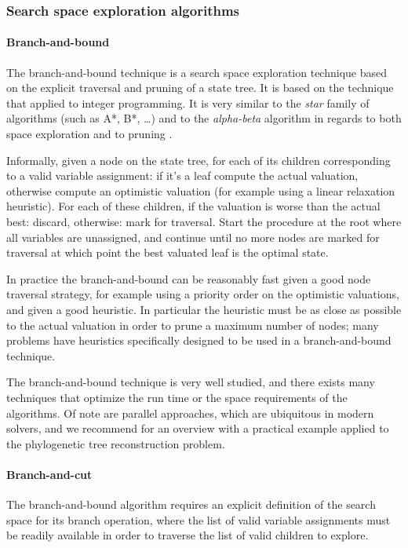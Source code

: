 		\subsubsection{Search space exploration algorithms}
		\label{subsec:bnsalgo}

			\paragraph{Branch-and-bound}
			The branch-and-bound technique is a search space exploration technique based on the explicit traversal and pruning of a state tree.
			It is based on the technique that \textcite{land1960automatic} applied to integer programming.
			It is very similar to the \emph{star} family of algorithms (such as A*, B*, \dots{}) and to the \emph{alpha-beta} algorithm in regards to both space exploration and to pruning \parencite{nau1984general}.

			Informally, given a node on the state tree, for each of its children corresponding to a valid variable assignment: if it's a leaf compute the actual valuation, otherwise compute an optimistic valuation (for example using a linear relaxation heuristic).
			For each of these children, if the valuation is worse than the actual best: discard, otherwise: mark for traversal.
			Start the procedure at the root where all variables are unassigned, and continue until no more nodes are marked for traversal at which point the best valuated leaf is the optimal state.

			In practice the branch-and-bound can be reasonably fast given a good node traversal strategy, for example using a priority order on the optimistic valuations, and given a good heuristic.
			In particular the heuristic must be as close as possible to the actual valuation in order to prune a maximum number of nodes; many problems have heuristics specifically designed to be used in a branch-and-bound technique.

			The branch-and-bound technique is very well studied, and there exists many techniques that optimize the run time or the space requirements of the algorithms.
			Of note are parallel approaches, which are ubiquitous in modern solvers, and we recommend \parencite{bader2005parallel} for an overview with a practical example applied to the phylogenetic tree reconstruction problem.


			\paragraph{Branch-and-cut}
			\label{par:b-a-cut}
			The branch-and-bound algorithm requires an explicit definition of the search space for its branch operation, where the list of valid variable assignments must be readily available in order to traverse the list of valid children to explore.

